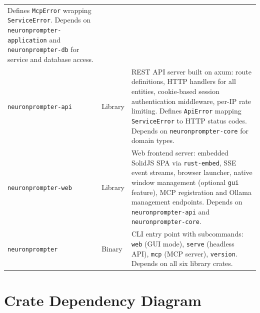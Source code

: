 \documentclass[a4paper, 11pt, oneside]{report}
\begin{document}
\begin{table}[H]
\begin{tabularx}{\textwidth}{l l X}
      Defines \texttt{McpError} wrapping \texttt{ServiceError}.
      Depends on \texttt{neuronprompter-application} and
      \texttt{neuronprompter-db} for service and database access. \\
    \texttt{neuronprompter-api}  & Library &
      REST API server built on axum: route definitions, HTTP
      handlers for all entities, cookie-based session authentication
      middleware, per-IP rate limiting.
      Defines \texttt{ApiError} mapping \texttt{ServiceError}
      to HTTP status codes.
      Depends on \texttt{neuronprompter-core} for domain types. \\
    \texttt{neuronprompter-web}  & Library &
      Web frontend server: embedded SolidJS SPA via
      \texttt{rust-embed}, SSE event streams, browser launcher,
      native window management (optional \texttt{gui} feature),
      MCP registration and Ollama management endpoints.
      Depends on \texttt{neuronprompter-api} and
      \texttt{neuronprompter-core}. \\
    \texttt{neuronprompter}      & Binary &
      CLI entry point with subcommands: \texttt{web} (GUI mode),
      \texttt{serve} (headless API), \texttt{mcp} (MCP server),
      \texttt{version}.
      Depends on all six library crates. \\
    \bottomrule
  \end{tabularx}
\end{table}

\section{Crate Dependency Diagram}
\label{sec:crate-deps}
\end{document}
